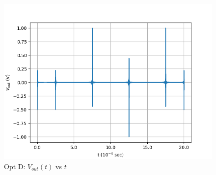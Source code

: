 \documentclass[journal,12pt,twocolumn]{IEEEtran}
\theoremstyle{remark}
\begin{document}
\begin{enumerate}
\begin{figure}[!h]
        \centering
        \includegraphics[width = \columnwidth]{figs/opt_d_res.png}
        \caption{Opt D: $V_{out}(t)$ vs $t$}
        \label{fig:opt_d_res_gate.23.ph.37}
    \end{figure}
\end{enumerate}
\end{document}
